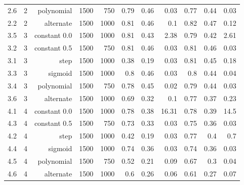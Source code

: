 \begin{table}[]
{\begin{tabular}{rrrrrrrrrrr}
          2.6                  & 2                    & polynomial           & 1500           & 750     & 0.79  & 0.46 & 0.03  & 0.77 & 0.44 & 0.03  \\
          2.2                  & 2                    & alternate            & 1500           & 1000    & 0.81  & 0.46 & 0.1   & 0.82 & 0.47 & 0.12  \\
          \hline
          3.5                  & 3                    & constant 0.0         & 1500           & 1000    & 0.81  & 0.43 & 2.38  & 0.79 & 0.42 & 2.61  \\
          3.2                  & 3                    & constant 0.5         & 1500           & 750     & 0.81  & 0.46 & 0.03  & 0.81 & 0.46 & 0.03  \\
          3.1                  & 3                    & step                 & 1500           & 1000    & 0.38  & 0.19 & 0.03  & 0.81 & 0.45 & 0.18  \\
          3.3                  & 3                    & sigmoid              & 1500           & 1000    & 0.8   & 0.46 & 0.03  & 0.8  & 0.44 & 0.04  \\
          3.4                  & 3                    & polynomial           & 1500           & 750     & 0.78  & 0.45 & 0.02  & 0.79 & 0.44 & 0.03  \\
          3.6                  & 3                    & alternate            & 1500           & 1000    & 0.69  & 0.32 & 0.1   & 0.77 & 0.37 & 0.23  \\
          \hline
          4.1                  & 4                    & constant 0.0         & 1500           & 1000    & 0.78  & 0.38 & 16.31 & 0.78 & 0.39 & 14.5  \\
          4.3                  & 4                    & constant 0.5         & 1500           & 750     & 0.73  & 0.33 & 0.03  & 0.75 & 0.36 & 0.03  \\
          4.2                  & 4                    & step                 & 1500           & 1000    & 0.42  & 0.19 & 0.03  & 0.77 & 0.4  & 0.7   \\
          4.4                  & 4                    & sigmoid              & 1500           & 1000    & 0.74  & 0.36 & 0.03  & 0.74 & 0.36 & 0.03  \\
          4.5                  & 4                    & polynomial           & 1500           & 750     & 0.52  & 0.21 & 0.09  & 0.67 & 0.3  & 0.04  \\
          4.6                  & 4                    & alternate            & 1500           & 1000    & 0.6   & 0.26 & 0.06  & 0.61 & 0.27 & 0.07  \\

\end{tabular}}
\end{table}
